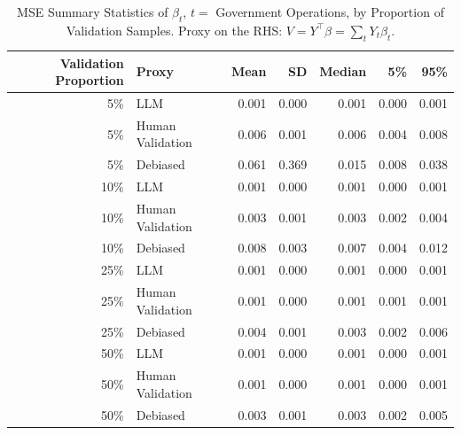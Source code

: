\begin{table}

\caption{MSE Summary Statistics of $\beta_{t}$, $t=$ Government Operations, by Proportion of Validation Samples.
      Proxy on the RHS: $V = Y^\top \beta = \sum_{t} Y_t \beta_t$.}
\centering
\begin{tabular}[t]{rlrrrrr}
\toprule
Validation Proportion & Proxy & Mean & SD & Median & 5\% & 95\%\\
\midrule
5\% & LLM & 0.001 & 0.000 & 0.001 & 0.000 & 0.001\\
5\% & Human Validation & 0.006 & 0.001 & 0.006 & 0.004 & 0.008\\
5\% & Debiased & 0.061 & 0.369 & 0.015 & 0.008 & 0.038\\
10\% & LLM & 0.001 & 0.000 & 0.001 & 0.000 & 0.001\\
10\% & Human Validation & 0.003 & 0.001 & 0.003 & 0.002 & 0.004\\
10\% & Debiased & 0.008 & 0.003 & 0.007 & 0.004 & 0.012\\
25\% & LLM & 0.001 & 0.000 & 0.001 & 0.000 & 0.001\\
25\% & Human Validation & 0.001 & 0.000 & 0.001 & 0.001 & 0.001\\
25\% & Debiased & 0.004 & 0.001 & 0.003 & 0.002 & 0.006\\
50\% & LLM & 0.001 & 0.000 & 0.001 & 0.000 & 0.001\\
50\% & Human Validation & 0.001 & 0.000 & 0.001 & 0.000 & 0.001\\
50\% & Debiased & 0.003 & 0.001 & 0.003 & 0.002 & 0.005\\
\bottomrule
\end{tabular}
\end{table}
